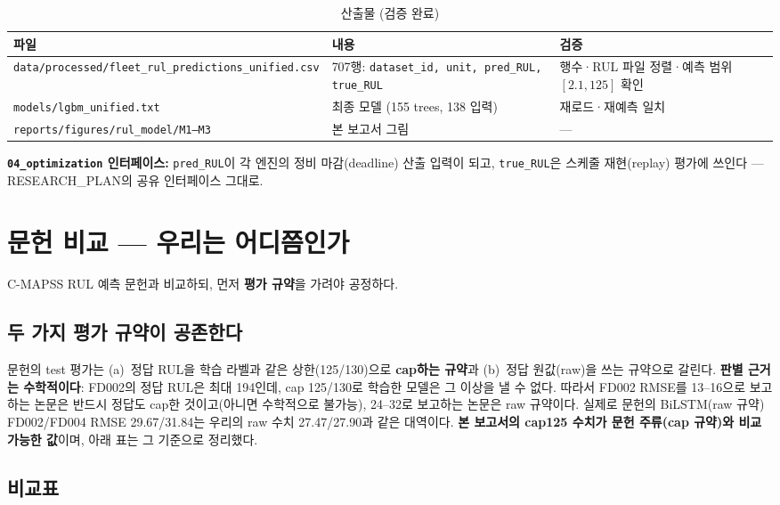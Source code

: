 \documentclass[11pt]{article}
\begin{document}
\begin{table}[H]
\centering
\caption{산출물 (검증 완료)}
\label{tab:out}
\begin{tabular}{llp{6.0cm}}
\toprule
파일 & 내용 & 검증 \\
\midrule
\texttt{data/processed/fleet\_rul\_predictions\_unified.csv} & 707행: \texttt{dataset\_id, unit, pred\_RUL, true\_RUL} & 행수·RUL 파일 정렬·예측 범위 $[2.1, 125]$ 확인 \\
\texttt{models/lgbm\_unified.txt} & 최종 모델 (155 trees, 138 입력) & 재로드·재예측 일치 \\
\texttt{reports/figures/rul\_model/M1--M3} & 본 보고서 그림 & — \\
\bottomrule
\end{tabular}
\end{table}

\textbf{\texttt{04\_optimization} 인터페이스:} \texttt{pred\_RUL}이 각 엔진의 정비 마감(deadline) 산출 입력이 되고,
\texttt{true\_RUL}은 스케줄 재현(replay) 평가에 쓰인다 — RESEARCH\_PLAN의 공유 인터페이스 그대로.

\section{문헌 비교 — 우리는 어디쯤인가}

C-MAPSS RUL 예측 문헌과 비교하되, 먼저 \textbf{평가 규약}을 가려야 공정하다.

\subsection{두 가지 평가 규약이 공존한다}

문헌의 test 평가는 (a)~정답 RUL을 학습 라벨과 같은 상한(125/130)으로 \textbf{cap하는 규약}과 (b)~정답 원값(raw)을 쓰는 규약으로 갈린다.
\textbf{판별 근거는 수학적이다}: FD002의 정답 RUL은 최대 194인데, cap 125/130로 학습한 모델은 그 이상을 낼 수 없다.
따라서 FD002 RMSE를 13--16으로 보고하는 논문은 반드시 정답도 cap한 것이고(아니면 수학적으로 불가능),
24--32로 보고하는 논문은 raw 규약이다.
실제로 문헌의 BiLSTM(raw 규약) FD002/FD004 RMSE 29.67/31.84는 우리의 raw 수치 27.47/27.90과 같은 대역이다.
\textbf{본 보고서의 cap125 수치가 문헌 주류(cap 규약)와 비교 가능한 값}이며, 아래 표는 그 기준으로 정리했다.

\subsection{비교표}
\end{document}
